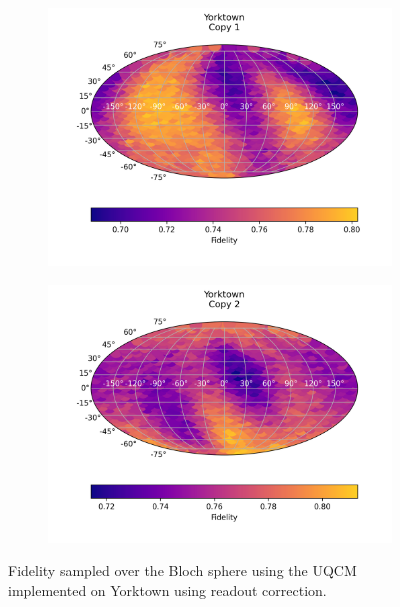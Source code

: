 \begin{figure}[H]
    \centering
    \begin{subfigure}{.5\textwidth}
      \centering
      \includegraphics[width=\textwidth]{Figures/UQCM/IBM/FullSphere/results_corrected_ibmqx2_copy1.png}
    \end{subfigure}%
    \begin{subfigure}{.5\textwidth}
      \centering
      \includegraphics[width=\textwidth]{Figures/UQCM/IBM/FullSphere/results_corrected_ibmqx2_copy2.png}
    \end{subfigure}
\caption{Fidelity sampled over the Bloch sphere using the UQCM implemented on Yorktown using readout correction.}
    \label{fig:uqcm_york}
\end{figure}

